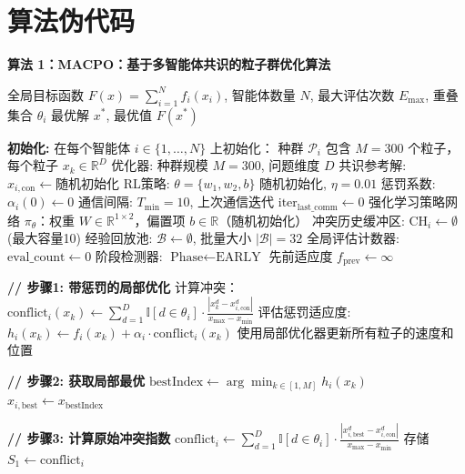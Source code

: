 \documentclass[11pt,a3paper]{ctexart}
\begin{document}
\section{算法伪代码}
\noindent\textbf{算法 1：MACPO：基于多智能体共识的粒子群优化算法}
\begin{algorithmic}[1]
\Require 全局目标函数 $F(x) = \sum_{i=1}^N f_i(x_i)$, 智能体数量 $N$, 最大评估次数 $E_{\max}$, 重叠集合 $\theta_i$
\Ensure 最优解 $x^*$, 最优值 $F(x^*)$

\State \textbf{初始化:}
\State  在每个智能体 $i \in \{1, \ldots, N\}$ 上初始化：
\State \quad 种群 $\mathcal{P}_i$ 包含 $M=300$ 个粒子，每个粒子 $x_k \in \mathbb{R}^{D}$
\State \quad 优化器: 种群规模 $M=300$, 问题维度 $D$
\State \quad 共识参考解: $x_{i,\text{con}} \gets \text{随机初始化}$
\State \quad RL策略: $\theta = \{w_1, w_2, b\}$ 随机初始化, $\eta=0.01$
\State \quad 惩罚系数: $\alpha_i(0) \gets 0$ 
\State \quad 通信间隔: $T_{\min}=10$, 上次通信迭代 $\text{iter}_{\text{last\_comm}} \gets 0$
\State \quad 强化学习策略网络 $\pi_\theta$：权重 $W \in \mathbb{R}^{1 \times 2}$，偏置项 $b \in \mathbb{R}$（随机初始化）
\State \quad 冲突历史缓冲区: $\text{CH}_i \gets \emptyset$ (最大容量10)
\State \quad 经验回放池: $\mathcal{B} \gets \emptyset$, 批量大小 $|\mathcal{B}|=32$
\State \quad 全局评估计数器: $\text{eval\_count} \gets 0$
\State \quad 阶段检测器: $\text{Phase} \gets \text{EARLY}$
\State \quad 先前适应度 $f_{\text{prev}} \gets \infty$

    \State \textbf{// 步骤1: 带惩罚的局部优化}
       \State \quad 计算冲突：$\text{conflict}_i(x_k) \gets \sum_{d=1}^{D} \mathbb{I}[d \in \theta_i] \cdot \frac{|x_k^d - x_{i,\text{con}}^d|}{x_{\max} - x_{\min}}$
       \State \quad 评估惩罚适应度: $h_i(x_k) \gets f_i(x_k) + \alpha_i \cdot \text{conflict}_i(x_k)$ 
        \EndFor
        \State 使用局部优化器更新所有粒子的速度和位置
    \EndFor
    
    \State \textbf{// 步骤2: 获取局部最优}
    \State $\text{bestIndex} \gets \arg\min_{k \in [1,M]} h_i(x_k)$
    \State $x_{i,\text{best}} \gets x_{\text{bestIndex}}$ 
    
    \State \textbf{// 步骤3: 计算原始冲突指数}
    \State $\text{conflict}_i \gets \sum_{d=1}^{D} \mathbb{I}[d \in \theta_i] \cdot \frac{|x_{i,\text{best}}^d - x_{i,\text{con}}^d|}{x_{\max} - x_{\min}}$
    \State 存储 $S_1 \gets \text{conflict}_i$ 
    

\end{algorithmic}
\end{document}
